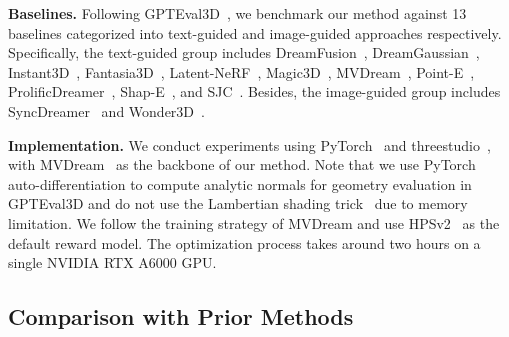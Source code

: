 \textbf{Baselines.} Following GPTEval3D~\citep{wu2024gpt}, we benchmark our method against 13 baselines categorized into text-guided and image-guided approaches respectively. Specifically, the text-guided group includes DreamFusion~\citep{poole2022dreamfusion}, DreamGaussian~\citep{tang2023dreamgaussian}, Instant3D~\citep{li2023instant3d}, Fantasia3D~\citep{chen2023fantasia3d}, Latent-NeRF~\citep{metzer2023latent}, Magic3D~\citep{lin2023magic3d}, MVDream~\citep{shi2023mvdream}, Point-E~\citep{nichol2022point}, ProlificDreamer~\citep{wang2024prolificdreamer}, Shap-E~\citep{jun2023shap}, and SJC~\citep{wang2023score}. Besides, the image-guided group includes SyncDreamer~\citep{liu2023syncdreamer} and Wonder3D~\citep{long2024wonder3d}.

\textbf{Implementation.} We conduct experiments using PyTorch~\citep{paszke2019pytorch} and threestudio~\citep{threestudio2023}, with MVDream~\citep{shi2023mvdream} as the backbone of our method. Note that we use PyTorch auto-differentiation to compute analytic normals for geometry evaluation in GPTEval3D and do not use the Lambertian shading trick~\citep{lin2023magic3d} due to memory limitation. We follow the training strategy of MVDream and use HPSv2~\citep{wu2023human} as the default reward model.
The optimization process takes around two hours on a single NVIDIA RTX A6000 GPU.



\subsection{Comparison with Prior Methods}\label{sec:exp_comparison}

